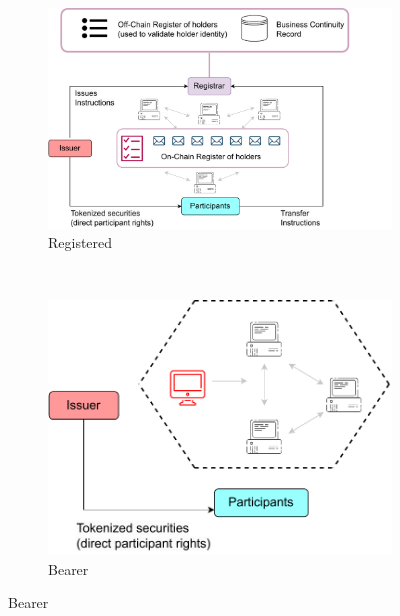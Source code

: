 \begin{figure}
     \centering
     \begin{subfigure}[b]{0.8\textwidth}
         \centering
         \begin{minipage}[b][8cm][c]{\linewidth} %
             \centering
             \includegraphics[width=0.8\linewidth]{images/chapter-2/registerd_custom.drawio.pdf}
             \caption{Registered}
             \label{subfig:registered}
         \end{minipage}
     \end{subfigure}
     \\
     \begin{subfigure}[b]{0.7\textwidth}
         \centering
         \begin{minipage}[b][8cm][c]{\linewidth} %
             \centering
             \includegraphics[width=0.8\linewidth]{images/chapter-2/bearer_custom.drawio.pdf}
             \caption{Bearer}
             \label{subfig:bearer}
         \end{minipage}
     \end{subfigure}

\end{figure}
